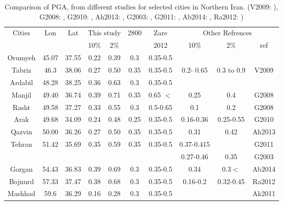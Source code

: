 \begin{table}[h]
\centering
\caption{Comparison of PGA, from different studies for selected cities in Northern Iran. (V2009:  \citet{vafaie2011}), G2008: \citet{Ghodrati2008}, G2010: \citet{Ghodrati2010},  Ah2013: \citet{Ahmadi2013}, G2003:  \citet{Ghodrati2003}, G2011: \citet{Ghodrati2011}, Ab2014: \citet{Abdollahzadeh2014} , Ra2012: \citet{Rahgozar2012}) }
\begin{tabular}{ | c | c | c | c | c | c | c | c | c | c |}


\hline

	
	\multirow{2}{*}{Cities} & \multirow{2}{*}{Lon} & \multirow{2}{*}{Lat} & \multicolumn{2}{|c|}{This study} & \multirow{2}{*}{2800} & Zare & \multicolumn{3}{|c|}{Other Refrences}    \\ 
	\cline{4-5}  \cline{8-10}  &  &  & 10\% & 2\% &  &  2012 & 10\% & 2\% & ref \\ \hline
	Orumyeh & 45.07 & 37.55 & 0.22 & 0.39 & 0.3 & 0.35-0.5 &  &  &  \\ \hline
	Tabriz      & 46.3     & 38.06 & 0.27& 0.50 & 0.35 & 0.35-0.5 & 0.2- 0.65 & 0.3 to 0.9 & V2009 \\ \hline
	Ardabil    & 48.28 & 38.25 & 0.36 & 0.63 & 0.3 & 0.35-0.5 &  &  &  \\ \hline
	Manjil     & 49.40 & 36.74 & 0.39 & 0.71 & 0.35 & 0.65 $<$ & 0.25 & 0.4 & G2008 \\ \hline
	Rasht     & 49.58 & 37.27 & 0.33 & 0.55 & 0.3 & 0.5-0.65 & 0.1 & 0.2 & G2008 \\ \hline 
	Arak       & 49.68 & 34.09 & 0.24 & 0.48 & 0.25 & 0.35-0.5 & 0.16-0.36 & 0.25-0.55 & G2010 \\ \hline
	Qazvin   & 50.00 & 36.26 & 0.27 & 0.50 & 0.35 & 0.35-0.5 & 0.31 & 0.42 & Ah2013 \\ \hline
	 \multirow{2}{*}{Tehran}  & \multirow{2}{*}{51.42} & \multirow{2}{*}{35.69} & \multirow{2}{*}{0.35} & \multirow{2}{*}{0.59} & \multirow{2}{*}{0.35} & \multirow{2}{*}{0.35-0.5} & 0.37-0.415 &  &  G2011 \\ 
	 \cline{8-10}	             &  &  &  &  &  &  & 0.27-0.46 & 0.35 & G2003\\ \hline
	Gorgan & 54.43 & 36.83 & 0.39 & 0.69 & 0.3 & 0.35-0.5 & 0.34 & 0.3$<$ & Ab2014\\ \hline
	Bojnurd & 57.33 & 37.47 & 0.38 & 0.68 & 0.3 & 0.35-0.5 &0.16-0.2  & 0.32-0.45  & Ra2012  \\ \hline
	Mashhad & 59.6 & 36.29 & 0.16 & 0.28 & 0.3 & 0.35-0.5 &  &  & Ak2011 \\ \hline

\end{tabular}

\end{table}


